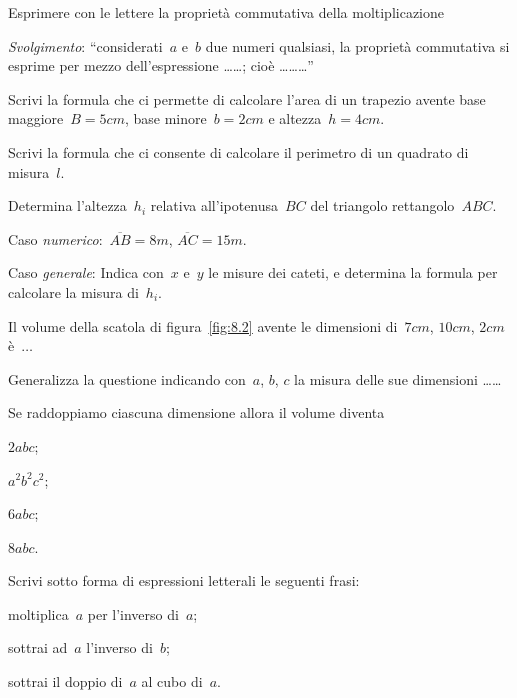 \begin{esercizio}
\label{ese:8.6}
Esprimere con le lettere la proprietà commutativa della moltiplicazione

\emph{Svolgimento}: ``considerati~$a$ e~$b$ due numeri qualsiasi, la proprietà commutativa si esprime per mezzo dell'espressione \ldots\ldots; cioè \ldots\ldots\ldots''
\end{esercizio}

\begin{multicols}{2}
\begin{esercizio}
\label{ese:8.7}
Scrivi la formula che ci permette di calcolare l'area di un trapezio avente base maggiore~$B=5\unit{cm}$, base minore~$b=2\unit{cm}$ e altezza~$h=4\unit{cm}$.
\end{esercizio}

\begin{esercizio}
\label{ese:8.8}
Scrivi la formula che ci consente di calcolare il perimetro di un quadrato di misura~$l$.
\end{esercizio}

\begin{esercizio}
\label{ese:8.9}
Determina l'altezza~$h_i$ relativa all'ipotenusa~$BC$ del triangolo rettangolo~$ABC$.

Caso \emph{numerico}:~$\overline{AB}=8\unit{m}$, $\overline{AC}=15\unit{m}.$

Caso \emph{generale}: Indica con~$x$ e~$y$ le misure dei cateti, e determina la formula per calcolare la misura di~$h_i$.
\end{esercizio}

\begin{esercizio}
\label{ese:8.10}
Il volume della scatola di figura~\ref{fig:8.2} avente le dimensioni di~$7\unit{cm}$, $10\unit{cm}$, $2\unit{cm}$ è~$\ldots$

Generalizza la questione indicando con~$a$, $b$, $c$ la misura delle sue dimensioni \ldots\ldots

Se raddoppiamo ciascuna dimensione allora il volume diventa
 \begin{enumeratea}
 \item $2abc$;
 \item $a^{2}b^{2}c^{2}$;
 \item $6abc$;
 \item $8abc$.
 \end{enumeratea}
\end{esercizio}

\begin{esercizio}[\Ast]
\label{ese:8.11}
Scrivi sotto forma di espressioni letterali le seguenti frasi:
 \begin{enumeratea}
 \item moltiplica~$a$ per l'inverso di~$a$;
 \item sottrai ad~$a$ l'inverso di~$b$;
 \item sottrai il doppio di~$a$ al cubo di~$a$.
 \end{enumeratea}
\end{esercizio}


\end{multicols}
